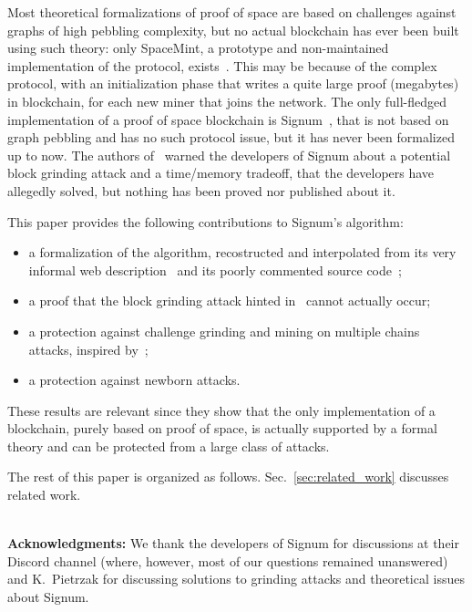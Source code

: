 Most theoretical formalizations of proof of space are
based on challenges against graphs of high pebbling complexity, but
no actual blockchain has ever been built using such theory: only SpaceMint, a prototype and non-maintained
implementation of the protocol, exists~\cite{ParkKFGAP18}. This may be because of the
complex protocol, with an initialization phase
that writes a quite large proof (megabytes) in blockchain,
for each new miner that joins the network.
The only full-fledged implementation of a proof of space blockchain is Signum~\cite{Signum}, that is
not based on graph pebbling and has no such protocol issue, but it has never been formalized up to now.
The authors of~\cite{ParkKFGAP18} warned the developers of Signum about a potential block grinding attack and
a time/memory tradeoff, that the developers have allegedly solved,
but nothing has been proved nor published about it.

This paper provides the following contributions to Signum's algorithm:
%
\begin{itemize}
\item a formalization of the algorithm, recostructed and interpolated from its very informal
  web description~\cite{SignumPlotting} and its poorly commented source code~\cite{SignumSource};
\item a proof that the block grinding attack hinted in~\cite{ParkKFGAP18} cannot actually occur;
\item a protection against challenge grinding and mining on multiple chains attacks, inspired by~\cite{ParkKFGAP18};
\item a protection against newborn attacks.
\end{itemize}
%
These results are relevant since they show that the only implementation
of a blockchain, purely based on proof of space, is actually supported by a formal theory
and can be protected from a large class of attacks.

The rest of this paper is organized as follows.
Sec.~\ref{sec:related_work} discusses related work.

\mbox{}\\

\textbf{Acknowledgments:}
We thank the developers of Signum for discussions at their Discord channel (where, however, most
of our questions remained unanswered) and K.\ Pietrzak for discussing solutions to
grinding attacks and theoretical issues about Signum.
